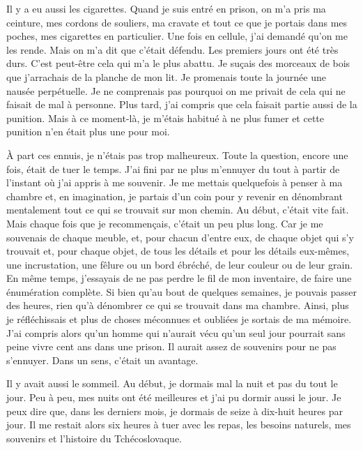 \documentclass[french,twoside]{book} %
\begin{document}
Il y a eu aussi les cigarettes. Quand je suis entré en prison, on m’a pris ma ceinture, mes cordons de souliers, ma cravate et tout ce que je portais dans mes poches, mes cigarettes en particulier. Une fois en cellule, j’ai demandé qu’on me les rende. Mais on m’a dit que c’était défendu. Les premiers jours ont été très durs. C'est peut-être cela qui m’a le plus abattu. Je suçais des morceaux de bois que j’arrachais de la planche de mon lit. Je promenais toute la journée une nausée perpétuelle. Je ne comprenais pas pourquoi on me privait de cela qui ne faisait de mal à personne. Plus tard, j’ai compris que cela faisait partie aussi de la punition. Mais à ce moment-là, je m’étais habitué à ne plus fumer et cette punition n’en était plus une pour moi.\par
À part ces ennuis, je n’étais pas trop malheureux. Toute la question, encore une fois, était de tuer le temps. J'ai fini par ne plus m’ennuyer du tout à partir de l’instant où j’ai appris à me souvenir. Je me mettais quelquefois à penser à ma chambre et, en imagination, je partais d’un coin pour y revenir en dénombrant mentalement tout ce qui se trouvait sur mon chemin. Au début, c’était vite fait. Mais chaque fois que je recommençais, c’était un peu plus long. Car je me souvenais de chaque meuble, et, pour chacun d’entre eux, de chaque objet qui s’y trouvait et, pour chaque objet, de tous les détails et pour les détails eux-mêmes, une incrustation, une fêlure ou un bord ébréché, de leur couleur ou de leur grain. En même temps, j’essayais de ne pas perdre le fil de mon inventaire, de faire une énumération complète. Si bien qu’au bout de quelques semaines, je pouvais passer des heures, rien qu’à dénombrer ce qui se trouvait dans ma chambre. Ainsi, plus je réfléchissais et plus de choses méconnues et oubliées je sortais de ma mémoire. J'ai compris alors qu’un homme qui n’aurait vécu qu’un seul jour pourrait sans peine vivre cent ans dans une prison. Il aurait assez de souvenirs pour ne pas s’ennuyer. Dans un sens, c’était un avantage.\par
Il y avait aussi le sommeil. Au début, je dormais mal la nuit et pas du tout le jour. Peu à peu, mes nuits ont été meilleures et j’ai pu dormir aussi le jour. Je peux dire que, dans les derniers mois, je dormais de seize à dix-huit heures par jour. Il me restait alors six heures à tuer avec les repas, les besoins naturels, mes souvenirs et l’histoire du Tchécoslovaque.\par
\end{document}
